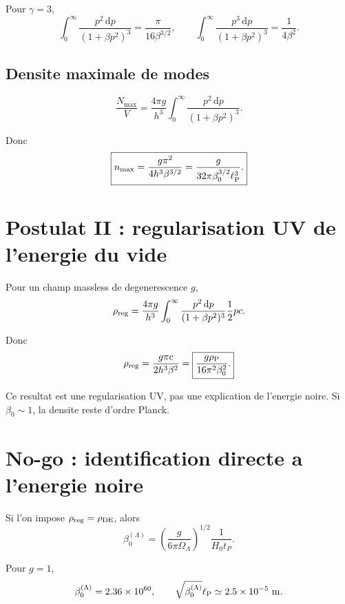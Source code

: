 \documentclass[11pt,a4paper]{article}
\newcommand{\lp}{\ell_{\rm P}}
\newcommand{\rp}{\rho_{\rm P}}
\newcommand{\rhoreg}{\rho_{\rm reg}}
\newcommand{\dif}{\mathrm d}
\begin{document}
Pour \(\gamma=3\),
\begin{equation}
\int_0^\infty \frac{p^2\,\dif p}{(1+\beta p^2)^3}
=\frac{\pi}{16\beta^{3/2}},
\qquad
\int_0^\infty \frac{p^3\,\dif p}{(1+\beta p^2)^3}
=\frac{1}{4\beta^2}.
\end{equation}

\subsection{Densite maximale de modes}

\begin{equation}
\frac{N_{\max}}{V}
=\frac{4\pi g}{h^3}\int_0^\infty \frac{p^2\,\dif p}{(1+\beta p^2)^3}.
\end{equation}

Donc
\begin{equation}
\boxed{
n_{\max}=\frac{g\pi^2}{4h^3\beta^{3/2}}
=\frac{g}{32\pi\beta_0^{3/2}\lp^3}.
}
\end{equation}

\section{Postulat II : regularisation UV de l'energie du vide}

Pour un champ massless de degenerescence \(g\),
\begin{equation}
\rhoreg=\frac{4\pi g}{h^3}\int_0^\infty
\frac{p^2\,\dif p}{(1+\beta p^2)^3}\frac12 pc.
\end{equation}

Donc
\begin{equation}
\rhoreg
=\frac{g\pi c}{2h^3\beta^2}
=\boxed{\frac{g\rp}{16\pi^2\beta_0^2}.}
\end{equation}

Ce resultat est une regularisation UV, pas une explication de l'energie noire.
Si \(\beta_0\sim1\), la densite reste d'ordre Planck.

\section{No-go : identification directe a l'energie noire}

Si l'on impose \(\rhoreg=\rho_{\rm DE}\), alors
\begin{equation}
\boxed{
\beta_0^{(\Lambda)}
=
\left(\frac{g}{6\pi\Omega_\Lambda}\right)^{1/2}\frac{1}{H_0t_P}.
}
\end{equation}

Pour \(g=1\),
\begin{equation}
\beta_0^{(\Lambda)}=2.36\times10^{60},
\qquad
\sqrt{\beta_0^{(\Lambda)}}\lp\simeq2.5\times10^{-5}\ {\rm m}.
\end{equation}
\end{document}
